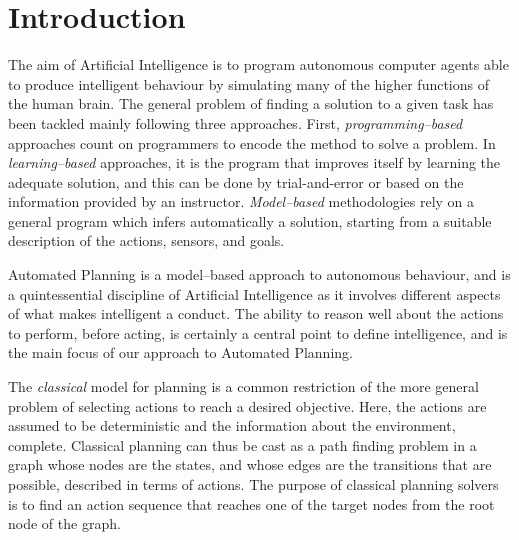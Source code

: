 \chapter{Introduction}
\label{chapter:classical-planning}

\begin{comment}
\begin{epigraphs}
  \qitem{Some text... \ldots } {}

  {\emph{That story}. \\ Short story by that guy}
\end{epigraphs}\end{comment}
The aim of Artificial Intelligence is 
to program autonomous computer agents able to produce intelligent behaviour
 by simulating many of the higher functions of the human brain. %
The general problem of finding a solution to a given task %
 has been tackled mainly 
following three approaches. First,
 \emph{programming--based} approaches count on programmers to encode the method to solve a problem.
 In \emph{learning--based} approaches, it is the program that improves itself by learning the adequate solution, and this can be done by trial-and-error or based on the information provided by an instructor.
 \emph{Model--based} methodologies rely on a  general program which infers automatically a solution, starting from a suitable description of the actions, sensors, and goals.

Automated Planning is a model--based approach to autonomous behaviour, and
 is a quintessential discipline of Artificial Intelligence as
it involves different aspects of what makes intelligent a conduct.
The ability to reason well about the actions to perform, before acting,
is certainly a central point to define intelligence, and is the main
focus of our approach to Automated Planning.

The \emph{classical} model for planning is a common restriction of the more general problem of selecting actions to reach a desired objective.
Here, the actions are assumed to be deterministic and the information about the environment, complete.
Classical planning can thus be cast as a path finding problem
in a graph whose nodes are the states, 
and whose edges are the transitions
that are possible, described in terms of actions.
The purpose of classical planning solvers is to find an action sequence that reaches one of the target nodes from the root node of the graph.

